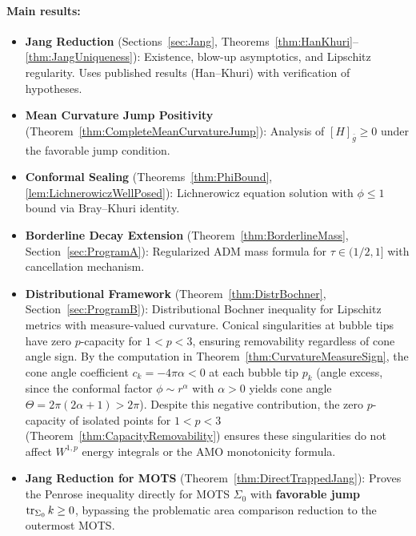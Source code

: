 \paragraph{Main results:}
\begin{itemize}
    \item \textbf{Jang Reduction} (Sections~\ref{sec:Jang}, Theorems~\ref{thm:HanKhuri}--\ref{thm:JangUniqueness}): Existence, blow-up asymptotics, and Lipschitz regularity. Uses published results (Han--Khuri) with verification of hypotheses.
    
    \item \textbf{Mean Curvature Jump Positivity} (Theorem~\ref{thm:CompleteMeanCurvatureJump}): Analysis of $[H]_{\bar{g}} \ge 0$ under the favorable jump condition.
    
    \item \textbf{Conformal Sealing} (Theorems~\ref{thm:PhiBound}, \ref{lem:LichnerowiczWellPosed}): Lichnerowicz equation solution with $\phi \le 1$ bound via Bray--Khuri identity.
    
    \item \textbf{Borderline Decay Extension} (Theorem~\ref{thm:BorderlineMass}, Section~\ref{sec:ProgramA}): Regularized ADM mass formula for $\tau \in (1/2, 1]$ with cancellation mechanism.
    
    \item \textbf{Distributional Framework} (Theorem~\ref{thm:DistrBochner}, Section~\ref{sec:ProgramB}): Distributional Bochner inequality for Lipschitz metrics with measure-valued curvature. Conical singularities at bubble tips have zero $p$-capacity for $1 < p < 3$, ensuring removability regardless of cone angle sign. By the computation in Theorem~\ref{thm:CurvatureMeasureSign}, the cone angle coefficient $c_k = -4\pi\alpha < 0$ at each bubble tip $p_k$ (angle excess, since the conformal factor $\phi \sim r^\alpha$ with $\alpha > 0$ yields cone angle $\Theta = 2\pi(2\alpha+1) > 2\pi$). Despite this negative contribution, the zero $p$-capacity of isolated points for $1 < p < 3$ (Theorem~\ref{thm:CapacityRemovability}) ensures these singularities do not affect $W^{1,p}$ energy integrals or the AMO monotonicity formula.
    
    \item \textbf{Jang Reduction for MOTS} (Theorem~\ref{thm:DirectTrappedJang}): Proves the Penrose inequality directly for MOTS $\Sigma_0$ with \textbf{favorable jump} $\operatorname{tr}_{\Sigma_0} k \ge 0$, bypassing the problematic area comparison reduction to the outermost MOTS.


\end{itemize}
